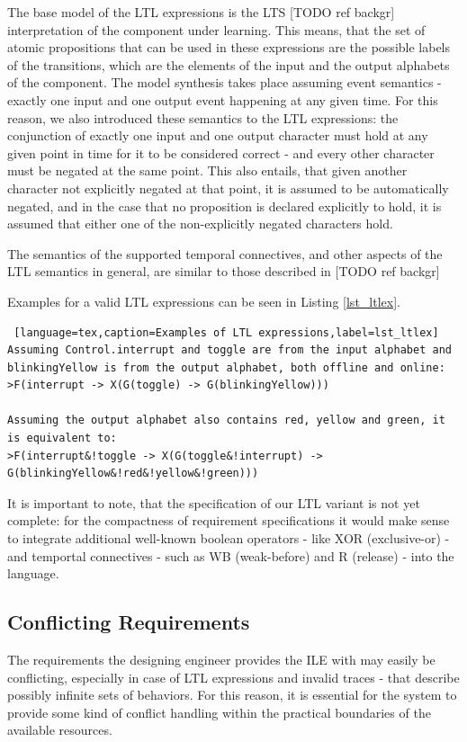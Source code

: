 The base model of the LTL expressions is the LTS [TODO ref backgr] interpretation of the component under learning. This means, that the set of atomic propositions that can be used in these expressions are the possible labels of the transitions, which are the elements of the input and the output alphabets of the component. The model synthesis takes place assuming event semantics - exactly one input and one output event happening at any given time. For this reason, we also introduced these semantics to the LTL expressions: the conjunction of exactly one input and one output character must hold at any given point in time for it to be considered correct - and every other character must be negated at the same point. This also entails, that given another character not explicitly negated at that point, it is assumed to be automatically negated, and in the case that no proposition is declared explicitly to hold, it is assumed that either one of the non-explicitly negated characters hold. 

The semantics of the supported temporal connectives, and other aspects of the LTL semantics in general, are similar to those described in [TODO ref backgr] %

Examples for a valid LTL expressions can be seen in Listing \ref{lst_ltlex}.

\bigskip
\begin{lstlisting} [language=tex,caption=Examples of LTL expressions,label=lst_ltlex]
Assuming Control.interrupt and toggle are from the input alphabet and blinkingYellow is from the output alphabet, both offline and online:
>F(interrupt -> X(G(toggle) -> G(blinkingYellow)))

Assuming the output alphabet also contains red, yellow and green, it is equivalent to:
>F(interrupt&!toggle -> X(G(toggle&!interrupt) -> G(blinkingYellow&!red&!yellow&!green)))
\end{lstlisting}

It is important to note, that the specification of our LTL variant is not yet complete: for the compactness of requirement specifications it would make sense to integrate additional well-known boolean operators - like XOR (exclusive-or) - and temportal connectives - such as WB (weak-before) and R (release) - into the language. 

\subsection{Conflicting Requirements} \label{subs_conf}
The requirements the designing engineer provides the ILE with may easily be conflicting, especially in case of LTL expressions and invalid traces - that describe possibly infinite sets of behaviors. For this reason, it is essential for the system to provide some kind of conflict handling within the practical boundaries of the available resources. 

